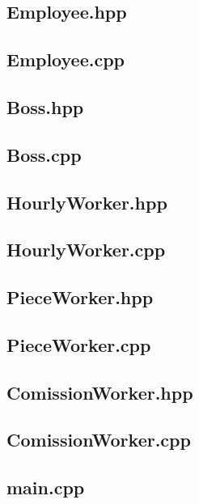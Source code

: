 \documentclass[12pt,naustrian,a4widepaper]{scrartcl}
\begin{document}
\subsection{Employee.hpp}

\subsection{Employee.cpp}


\subsection{Boss.hpp}

\subsection{Boss.cpp}


\subsection{HourlyWorker.hpp}

\subsection{HourlyWorker.cpp}


\subsection{PieceWorker.hpp}

\subsection{PieceWorker.cpp}


\subsection{ComissionWorker.hpp}

\subsection{ComissionWorker.cpp}


\subsection{main.cpp}


%


\end{document}
